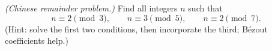 \begin{exercise}[$\star\star\star$]\label{exo:tle:arith:10}
\emph{(Chinese remainder problem.)} Find all integers $n$ such that
\[
n \equiv 2 \pmod 3, \qquad n \equiv 3 \pmod 5, \qquad n \equiv 2 \pmod 7 .
\]
(Hint: solve the first two conditions, then incorporate the third; Bézout
coefficients help.)
\end{exercise}
